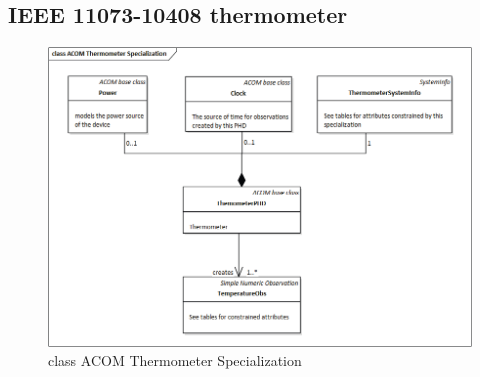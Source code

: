 \documentclass[a4paper]{article}
\begin{document}
        \subsection*{IEEE 11073-10408 thermometer}
        \begin{figure}[ht]
            \centering
            \includegraphics[width=1\textwidth]{figures/ACOM thermometer specialization class.png}
            \caption{class ACOM Thermometer Specialization}
        \end{figure}
\end{document}
